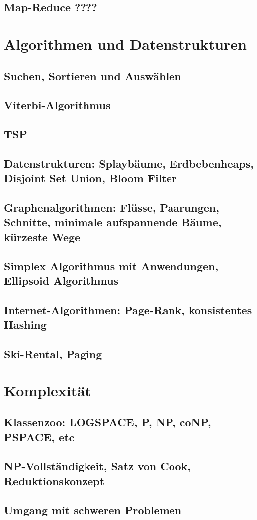 \documentclass[a4paper,10pt]{scrbook}
\begin{document}
\section{Map-Reduce ????}
\chapter{Algorithmen und Datenstrukturen}
\section{Suchen, Sortieren und Auswählen}
\section{Viterbi-Algorithmus}
\section{TSP}
\section{Datenstrukturen: Splaybäume, Erdbebenheaps, Disjoint Set Union, Bloom Filter}
\section{Graphenalgorithmen: Flüsse, Paarungen, Schnitte, minimale aufspannende Bäume, kürzeste Wege}
\section{Simplex Algorithmus mit Anwendungen, Ellipsoid Algorithmus}
\section{Internet-Algorithmen: Page-Rank, konsistentes Hashing}
\section{Ski-Rental, Paging}
\chapter{Komplexität}
\section{Klassenzoo: LOGSPACE, P, NP, coNP, PSPACE, etc}
\section{NP-Vollständigkeit, Satz von Cook, Reduktionskonzept}
\section{Umgang mit schweren Problemen}
\end{document}
